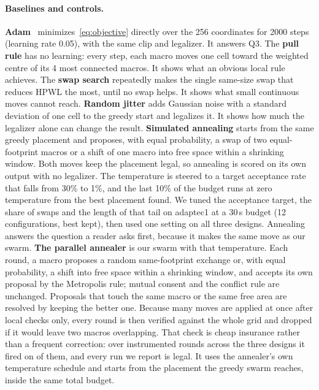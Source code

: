 \documentclass[10pt]{article}
\begin{document}
\paragraph{Baselines and controls.}
\textbf{Adam}~\citep{kingma2015adam} minimizes~\eqref{eq:objective} directly over the 256 coordinates for 2000 steps (learning rate 0.05), with the same clip and legalizer. It answers Q3.
The \textbf{pull rule} has no learning: every step, each macro moves one cell toward the weighted centre of its 4 most connected macros. It shows what an obvious local rule achieves.
The \textbf{swap search} repeatedly makes the single same-size swap that reduces HPWL the most, until no swap helps. It shows what small continuous moves cannot reach.
\textbf{Random jitter} adds Gaussian noise with a standard deviation of one cell to the greedy start and legalizes it. It shows how much the legalizer alone can change the result.
\textbf{Simulated annealing} starts from the same greedy placement and proposes, with equal probability, a swap of two equal-footprint macros or a shift of one macro into free space within a shrinking window. Both moves keep the placement legal, so annealing is scored on its own output with no legalizer. The temperature is steered to a target acceptance rate that falls from 30\% to 1\%, and the last 10\% of the budget runs at zero temperature from the best placement found. We tuned the acceptance target, the share of swaps and the length of that tail on adaptec1 at a 30\,s budget (12 configurations, best kept), then used one setting on all three designs. Annealing answers the question a reader asks first, because it makes the same move as our swarm.
\textbf{The parallel annealer} is our swarm with that temperature. Each round, a macro proposes a random same-footprint exchange or, with equal probability, a shift into free space within a shrinking window, and accepts its own proposal by the Metropolis rule; mutual consent and the conflict rule are unchanged. Proposals that touch the same macro or the same free area are resolved by keeping the better one. Because many moves are applied at once after local checks only, every round is then verified against the whole grid and dropped if it would leave two macros overlapping. That check is cheap insurance rather than a frequent correction: over \nVerifiedRounds{} instrumented rounds across the three designs it fired on \nRevertedRounds{} of them, and every run we report is legal. It uses the annealer's own temperature schedule and starts from the placement the greedy swarm reaches, inside the same total budget.
\end{document}
